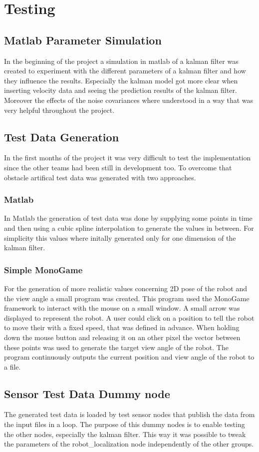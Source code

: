 \section{Testing}
\subsection{Matlab Parameter Simulation}
In the beginning of the project a simulation in matlab of a kalman filter was created to experiment with the different parameters of a kalman filter and how they influence the results. Especially the kalman model got more clear when inserting velocity data and seeing the prediction results of the kalman filter. Moreover the effects of the noise covariances where understood in a way that was very helpful throughout the project.
\subsection{Test Data Generation}
In the first months of the project it was very difficult to test the implementation since the other teams had been still in development too. To overcome that obstacle artifical test data was generated with two approaches.
\subsubsection{Matlab}
In Matlab the generation of test data was done by supplying some points in time and then using a cubic spline interpolation to generate the values in between. For simplicity this values where initally generated only for one dimension of the kalman filter.
\subsubsection{Simple MonoGame}
For the generation of more realistic values concerning 2D pose of the robot and the view angle a small program was created. This program used the MonoGame framework to interact with the mouse on a small window. A small arrow was displayed to represent the robot. A user could click on a position to tell the robot to move their with a fixed speed, that was defined in advance. When holding down the mouse button and releasing it on an other pixel the vector between these points was used to generate the target view angle of the robot. The program continuously outputs the current position and view angle of the robot to a file.
\subsection{Sensor Test Data Dummy node}
The generated test data is loaded by test sensor nodes that publish the data from the input files in a loop. The purpose of this dummy nodes is to enable testing the other nodes, especially the kalman filter. This way it was possible to tweak the parameters of the robot\_localization node independently of the other groups.
